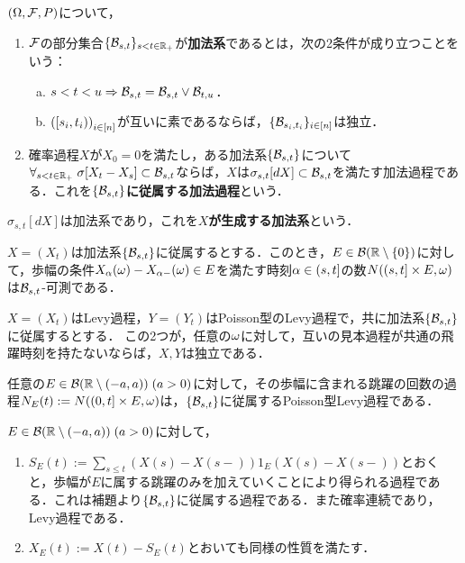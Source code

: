\documentclass[uplatex,dvipdfmx]{jsreport}
\begin{document}
\begin{definition}
    $(\Omega,\mathcal{F},P)$について，
    \begin{enumerate}
        \item $\mathcal{F}$の部分集合$\{\mathcal{B}_{s,t}\}_{s<t\in\mathbb{R}_+}$が\textbf{加法系}であるとは，次の2条件が成り立つことをいう：
        \begin{enumerate}[(a)]
            \item $s<t<u\Rightarrow\mathcal{B}_{s,t}=\mathcal{B}_{s,t}\lor\mathcal{B}_{t,u}$．
            \item $\left([s_i,t_i)\right)_{i\in[n]}$が互いに素であるならば，$\{\mathcal{B}_{s_i,t_i}\}_{i\in[n]}$は独立．
        \end{enumerate}
        \item 確率過程$X$が$X_0=0$を満たし，ある加法系$\{\mathcal{B}_{s,t}\}$について$\forall_{s<t\in\mathbb{R}_+}\;\sigma[X_t-X_s]\subset\mathcal{B}_{s,t}$ならば，$X$は$\sigma_{s,t}[dX]\subset\mathcal{B}_{s,t}$を満たす加法過程である．これを\textbf{$\{\mathcal{B}_{s,t}\}$に従属する加法過程}という．
    \end{enumerate}
\end{definition}
\begin{example}
    $\sigma_{s,t}[dX]$は加法系であり，これを\textbf{$X$が生成する加法系}という．
\end{example}

\begin{lemma}
    $X=(X_t)$は加法系$\{\mathcal{B}_{s,t}\}$に従属するとする．このとき，$E\in\mathcal{B}(\mathbb{R}\setminus\{0\})$に対して，歩幅の条件$X_\alpha(\omega)-X_{\alpha-}(\omega)\in E$を満たす時刻$\alpha\in(s,t]$の数$N((s,t]\times E,\omega)$は$\mathcal{B}_{s,t}$-可測である．
\end{lemma}

\begin{lemma}[独立性の十分条件]
    $X=(X_t)$はLevy過程，$Y=(Y_t)$はPoisson型のLevy過程で，共に加法系$\{\mathcal{B}_{s,t}\}$に従属するとする．
    この2つが，任意の$\omega$に対して，互いの見本過程が共通の飛躍時刻を持たないならば，$X,Y$は独立である．
\end{lemma}

\begin{lemma}
    任意の$E\in\mathcal{B}(\mathbb{R}\setminus(-a,a))\;(a>0)$に対して，その歩幅に含まれる跳躍の回数の過程$N_E(t):=N((0,t]\times E,\omega)$は，$\{\mathcal{B}_{s,t}\}$に従属するPoisson型Levy過程である．
\end{lemma}

\begin{notation}
    $E\in\mathcal{B}(\mathbb{R}\setminus(-a,a))\;(a>0)$に対して，
    \begin{enumerate}
        \item $S_E(t):=\sum_{s\le t}(X(s)-X(s-))1_E(X(s)-X(s-))$とおくと，歩幅が$E$に属する跳躍のみを加えていくことにより得られる過程である．これは補題より$\{\mathcal{B}_{s,t}\}$に従属する過程である．また確率連続であり，Levy過程である．
        \item $X_E(t):=X(t)-S_E(t)$とおいても同様の性質を満たす．
    \end{enumerate}
\end{notation}
\end{document}

